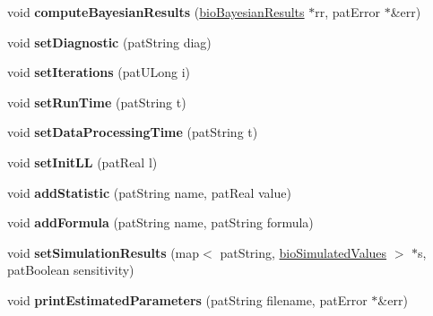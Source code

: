 \begin{DoxyCompactItemize}
\item 
\mbox{\label{classbio_reporting_aa2ec55e5c03a0159fa95b0ef991230f4}} 
void {\bfseries compute\+Bayesian\+Results} (\hyperlink{classbio_bayesian_results}{bio\+Bayesian\+Results} $\ast$rr, pat\+Error $\ast$\&err)
\item 
\mbox{\label{classbio_reporting_a2b20211a93e77a9c4fe65c5e30d70f8f}} 
void {\bfseries set\+Diagnostic} (pat\+String diag)
\item 
\mbox{\label{classbio_reporting_aa2dec8c5c6350aceda2fb1d4550aa0f0}} 
void {\bfseries set\+Iterations} (pat\+U\+Long i)
\item 
\mbox{\label{classbio_reporting_a2311afa49ace2c0e4f6c895a08b58826}} 
void {\bfseries set\+Run\+Time} (pat\+String t)
\item 
\mbox{\label{classbio_reporting_aa77cbf7f876ab54877e009d597cf8f19}} 
void {\bfseries set\+Data\+Processing\+Time} (pat\+String t)
\item 
\mbox{\label{classbio_reporting_af39336ef87dda602ec218d0ee722dc8f}} 
void {\bfseries set\+Init\+LL} (pat\+Real l)
\item 
\mbox{\label{classbio_reporting_a4e23cce6816892e835a170e2947c8b57}} 
void {\bfseries add\+Statistic} (pat\+String name, pat\+Real value)
\item 
\mbox{\label{classbio_reporting_a487ff64a2ea6e6c6dd49d29546b4cdb5}} 
void {\bfseries add\+Formula} (pat\+String name, pat\+String formula)
\item 
\mbox{\label{classbio_reporting_ae33b3b96e0cdbeb37f6bb45b66d3019b}} 
void {\bfseries set\+Simulation\+Results} (map$<$ pat\+String, \hyperlink{classbio_simulated_values}{bio\+Simulated\+Values} $>$ $\ast$s, pat\+Boolean sensitivity)
\item 
\mbox{\label{classbio_reporting_a157d199de3457fe561b74dc17e537183}} 
void {\bfseries print\+Estimated\+Parameters} (pat\+String filename, pat\+Error $\ast$\&err)

\end{DoxyCompactItemize}
